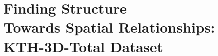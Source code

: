 
\chapter[]{Finding Structure \\ {\Large Towards Spatial Relationships: KTH-3D-Total Dataset}}
\label{chap:FindingStructures}



% 


% 

% 

% 

